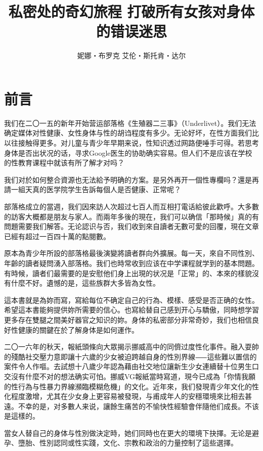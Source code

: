 \documentclass[12pt,UTF8]{ctexbook}
\title{\heiti\zihao{0} 私密处的奇幻旅程 打破所有女孩对身体的错误迷思}
\author{妮娜‧布罗克 艾伦‧斯托肯‧达尔}
\date{}
\begin{document}
\maketitle
\tableofcontents

\frontmatter

\chapter{前言}

我们在二〇一五的新年开始营运部落格《生殖器二三事》（Underlivet）。我们无法确定媒体对性健康、女性身体与性的胡诌程度有多少。无论好坏，在性方面我们比以往接触得更多。对儿童与青少年早期来说，性知识透过网路便唾手可得。若思考身体是否出状况的话，寻求Google医生的协助确实容易。但人们不是应该在学校的性教育课程中就该有所了解才对吗？

我们对於如何整合資源也无法給予明确的方案。是另外再开一個性專欄吗？還是再請一組天真的医学院学生告訴每個人是否健康、正常呢？

部落格成立的當週，我们因來訪人次超过七百人而互相打電话給彼此歡呼。大多數的訪客大概都是朋友与家人。而兩年多後的現在，我们可以确信「那時候」真的有問題需要我们解答。无论認识与否，我们收到來自讀者无數可愛的回覆，現在文章已經有超过一百四十萬的點閱數。

原本為青少年所設的部落格最後演變將讀者群向外擴展。每一天，來自不同性別、年齡的讀者疑問湧入部落格。我们也時常收到应该在中学课程就学到的基本問題。有時候，讀者们最需要的是安慰他们身上出現的状况是「正常」的、本來的樣貌沒有什麼不好。遺憾的是，這些族群大多皆為女性。

這本書就是為妳而寫，寫給每位不确定自己的行為、模樣、感受是否正确的女性。希望這本書能夠提供妳所需要的信心。也寫給替自己感到开心与驕傲，同時想学習更多存在雙腿之間美好器官之知识的妳。身体的私密部分非常奇妙，我们也相信良好性健康的關鍵在於了解身体是如何運作。

二〇一六年的秋天，報紙頭條向大眾揭示挪威高中的同儕过度性化事件。融入耍帥的殘酷社交壓力意即讓十六歲的少女被迫跨越自身的性別界線⸺這些難以置信的案件令人作嘔。去試想十八歲少年認為藉由社交地位讓新生少女連續替十位男生口交沒有什麼不对的想法确实可怕。挪威VG報紙當時寫道，現今已成為「你情我願的性行為与性暴力界線瀕臨模糊危機」的文化。近年來，我们發現青少年文化的性化程度激增，尤其在少女身上更容易被發現，与甫成年人的安穩環境來比相去甚遠。不幸的是，对多數人来说，讓餘生痛苦的不愉快性經驗會伴隨他们成長。不该是這樣的。

當女人替自己的身体与性別做決定時，她们同時也在更大的環境下抉擇。无论是避孕、墮胎、性別認同或性实踐，文化、宗教和政治的力量控制了這些選擇。
\end{document}
